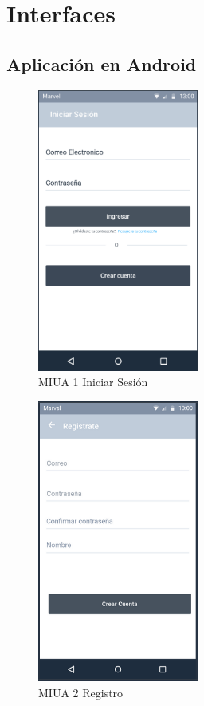 \section{Interfaces}
\subsection{Aplicación en Android}
\begin{figure}[h]
	\centering
	\includegraphics[width=200px]{capitulo4/imagenes/android/MIUA_1.png}
	\caption{MIUA 1 Iniciar Sesión}
	\label{fig:MIUA-1} %
\end{figure}
\newpage
\begin{figure}[h]
	\centering
	\includegraphics[width=200px]{capitulo4/imagenes/android/MIUA_2.png}
	\caption{MIUA 2 Registro}
	\label{fig:MIUA-2} %
\end{figure}
